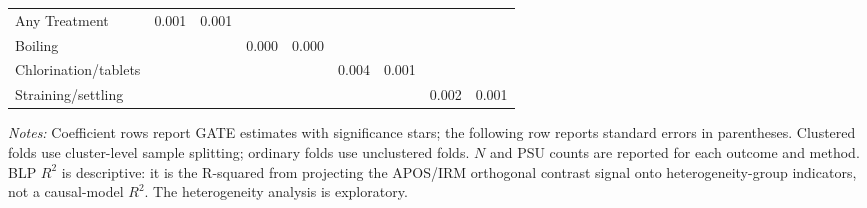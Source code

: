 \begin{landscape}
\begin{table}[p]
\begin{adjustbox}{max width=\linewidth, center}
\begin{tabular}{lcccccccc}
\quad Any Treatment & 0.001 & 0.001 &  &  &  &  &  &  \\
\quad Boiling &  &  & 0.000 & 0.000 &  &  &  &  \\
\quad Chlorination/tablets &  &  &  &  & 0.004 & 0.001 &  &  \\
\quad Straining/settling &  &  &  &  &  &  & 0.002 & 0.001 \\
\bottomrule
\end{tabular}
\end{adjustbox}
\par\vspace{3pt}
\begin{minipage}{\linewidth}\footnotesize \textit{Notes:} Coefficient rows report GATE estimates with significance stars; the following row reports standard errors in parentheses. Clustered folds use cluster-level sample splitting; ordinary folds use unclustered folds. $N$ and PSU counts are reported for each outcome and method. BLP $R^2$ is descriptive: it is the R-squared from projecting the APOS/IRM orthogonal contrast signal onto heterogeneity-group indicators, not a causal-model $R^2$. The heterogeneity analysis is exploratory.\end{minipage}
\end{table}
\end{landscape}